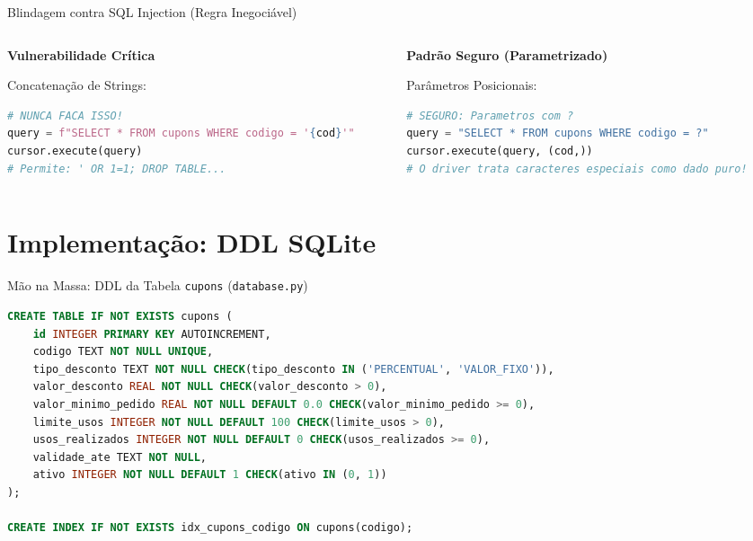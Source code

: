 \documentclass[10pt]{beamer}
\begin{document}
\begin{frame}[fragile]{Blindagem contra SQL Injection (Regra Inegociável)}
    \begin{columns}[t]
        \begin{column}{0.48\textwidth}
            \alert{\textbf{Vulnerabilidade Crítica}}\par
            \footnotesize Concatenação de Strings:
\begin{lstlisting}[language=Python]
# NUNCA FACA ISSO!
query = f"SELECT * FROM cupons WHERE codigo = '{cod}'"
cursor.execute(query)
# Permite: ' OR 1=1; DROP TABLE...
\end{lstlisting}
        \end{column}
        \begin{column}{0.48\textwidth}
            \textbf{Padrão Seguro (Parametrizado)}\par
            \footnotesize Parâmetros Posicionais:
\begin{lstlisting}[language=Python]
# SEGURO: Parametros com ?
query = "SELECT * FROM cupons WHERE codigo = ?"
cursor.execute(query, (cod,))
# O driver trata caracteres especiais como dado puro!
\end{lstlisting}
        \end{column}
    \end{columns}
\end{frame}

\section{Implementação: DDL SQLite}

\begin{frame}[fragile]{Mão na Massa: DDL da Tabela \texttt{cupons} (\texttt{database.py})}
\begin{lstlisting}[language=SQL]
CREATE TABLE IF NOT EXISTS cupons (
    id INTEGER PRIMARY KEY AUTOINCREMENT,
    codigo TEXT NOT NULL UNIQUE,
    tipo_desconto TEXT NOT NULL CHECK(tipo_desconto IN ('PERCENTUAL', 'VALOR_FIXO')),
    valor_desconto REAL NOT NULL CHECK(valor_desconto > 0),
    valor_minimo_pedido REAL NOT NULL DEFAULT 0.0 CHECK(valor_minimo_pedido >= 0),
    limite_usos INTEGER NOT NULL DEFAULT 100 CHECK(limite_usos > 0),
    usos_realizados INTEGER NOT NULL DEFAULT 0 CHECK(usos_realizados >= 0),
    validade_ate TEXT NOT NULL,
    ativo INTEGER NOT NULL DEFAULT 1 CHECK(ativo IN (0, 1))
);

CREATE INDEX IF NOT EXISTS idx_cupons_codigo ON cupons(codigo);
\end{lstlisting}
\end{frame}
\end{document}
